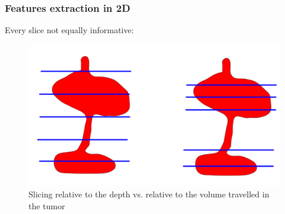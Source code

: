 \documentclass{beamer}
\begin{document}
\begin{frame}
    \frametitle{Features extraction in 2D}
    Every slice not equally informative:
    \begin{figure}
        \centering
        \includegraphics[scale = 0.2]{images/bad_shape.png}
        \caption{Slicing relative to the depth vs. relative to the volume travelled in the tumor}
    \end{figure}
\end{frame}

\end{document}
